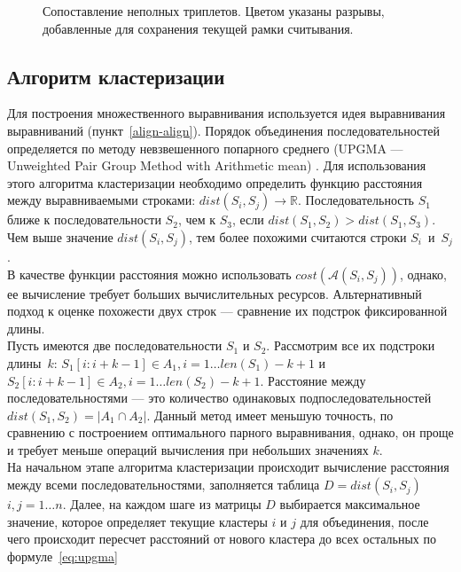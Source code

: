 \begin{figure}[h]
	\caption{Сопоставление неполных триплетов. Цветом указаны разрывы, добавленные для сохранения текущей рамки считывания.}
	\label{ris:NotCompleteCodons}
\end{figure}

\subsection[Алгоритм кластеризации]{\large Алгоритм кластеризации}
\hspace{\parindent} Для построения множественного выравнивания используется идея выравнивания выравниваний (пункт~\ref{align-align}). Порядок объединения последовательностей определяется по методу невзвешенного попарного среднего (UPGMA --- Unweighted Pair Group Method with Arithmetic mean) \cite{legendre1998numerical}. Для использования этого алгоритма кластеризации необходимо определить функцию расстояния между выравниваемыми строками: $dist(S_i, S_j) \rightarrow \mathbb{R}$. Последовательность $S_1$ ближе к последовательности $S_2$, чем к $S_3$, если $dist(S_1, S_2) > dist(S_1, S_3)$. Чем выше значение $dist(S_i, S_j)$, тем более похожими считаются строки $S_i$~и~$S_j$.\\
\indent В качестве функции расстояния можно использовать $cost(\mathcal{A}(S_i, S_j))$, однако, ее вычисление требует больших вычислительных ресурсов. Альтернативный подход к оценке похожести двух строк --- сравнение их подстрок фиксированной длины.\\
\indent Пусть имеются две последовательности $S_1$ и $S_2$. Рассмотрим все их подстроки длины~$k$: $S_1[i: i+k-1] \in A_1, i = 1\dots len(S_1)-k+1$ и $S_2[i: i+k-1] \in A_2, i = 1\dots len(S_2)-k+1$. Расстояние между последовательностями --- это количество одинаковых подпоследовательностей $dist(S_1, S_2) = |A_1\cap A_2|$. Данный метод имеет меньшую точность, по сравнению с построением оптимального парного выравнивания, однако, он проще и требует меньше операций вычисления при небольших значениях $k$.\\
\indent На начальном этапе алгоритма кластеризации происходит вычисление расстояния между всеми последовательностями, заполняется таблица $D=dist(S_i, S_j)$ $i,j=1 \dots n$. Далее, на каждом шаге из матрицы $D$ выбирается максимальное значение, которое определяет текущие кластеры $i$ и $j$ для объединения, после чего происходит пересчет расстояний от нового кластера до всех остальных по формуле~\ref{eq:upgma} 

